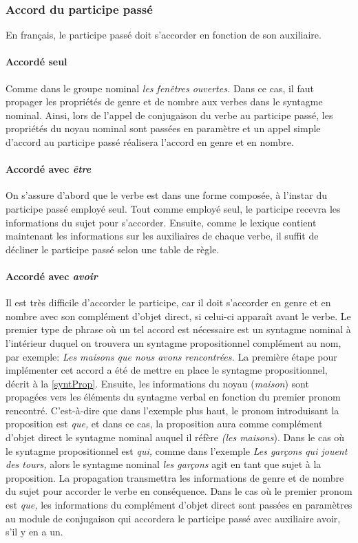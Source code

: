\documentclass[11pt]{article} %
\begin{document}
\subsubsection{Accord du participe passé}
\label{subsec:accordpp}
En français, le participe passé doit s'accorder en fonction de son
auxiliaire.\cite{ppGrevisse} 

\paragraph{Accordé seul}

Comme dans le groupe nominal \emph{les fenêtres ouvertes.} Dans ce cas,
il faut propager les propriétés
de genre et de nombre aux verbes dans le syntagme
nominal. Ainsi, lors de l'appel de conjugaison du verbe
au participe passé, les propriétés du noyau nominal sont passées en
paramètre et un appel simple d'accord au participe passé réalisera
l'accord en genre et en nombre.

\paragraph{Accordé avec \emph{être}}

On s'assure d'abord que le verbe est dans une forme composée,
à l'instar du participe passé employé seul. Tout comme employé seul, le participe
recevra les informations du sujet pour s'accorder. Ensuite, comme le lexique
contient maintenant les informations sur les auxiliaires de chaque
verbe, il suffit de décliner le participe passé selon une table de
règle.

\paragraph{Accordé avec \emph{avoir}}

Il est très difficile d'accorder le participe, car il doit s'accorder en genre et en nombre avec
son complément d'objet direct, si celui-ci apparaît avant le verbe. Le
premier type de phrase où un tel accord est nécessaire est un syntagme
nominal à l'intérieur duquel on trouvera un syntagme propositionnel
complément au nom, par exemple: \emph{Les maisons que nous avons rencontrées.}
La première étape pour implémenter cet accord a été de mettre en place
le syntagme propositionnel, décrit à la \autoref{syntProp}.
Ensuite, les informations du noyau (\emph{maison}) sont propagées
vers les éléments du syntagme verbal en fonction du premier pronom
rencontré. C'est-à-dire que dans l'exemple plus haut, le pronom introduisant
la proposition est \emph{que,} et dans ce cas, la proposition aura
comme complément d'objet direct le syntagme nominal auquel il réfère \emph{(les
maisons}). Dans le cas où le syntagme propositionnel
est \emph{qui, }comme dans l'exemple \emph{Les garçons qui jouent
des tours,} alors le syntagme nominal \emph{les garçons }agit en tant
que sujet à la proposition. La propagation transmettra les informations de genre et de nombre
du sujet pour accorder le verbe en conséquence. Dans le cas où le premier pronom est \emph{que,
}les informations du complément d'objet direct sont passées en paramètres
au module de conjugaison qui accordera le participe passé avec auxiliaire
avoir, s'il y en a un.
\end{document}
